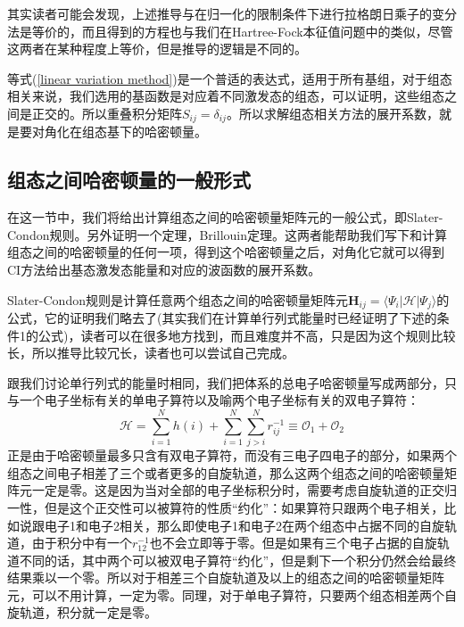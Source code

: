 \documentclass[12pt,a4paper,openany,twoside]{book}
\numberwithin{equation}{section}
\begin{document}
          其实读者可能会发现，上述推导与在归一化的限制条件下进行拉格朗日乘子的变分法是等价的，而且得到的方程也与我们在Hartree-Fock本征值问题中的类似，尽管这两者在某种程度上等价，但是推导的逻辑是不同的。

          等式(\ref{linear variation method})是一个普适的表达式，适用于所有基组，对于组态相关来说，我们选用的基函数是对应着不同激发态的组态，可以证明，这些组态之间是正交的。所以重叠积分矩阵$S_{ij} = \delta_{ij}$。所以求解组态相关方法的展开系数，就是要对角化在组态基下的哈密顿量。
        \subsection{组态之间哈密顿量的一般形式}
          在这一节中，我们将给出计算组态之间的哈密顿量矩阵元的一般公式，即Slater-Condon规则。另外证明一个定理，Brillouin定理。这两者能帮助我们写下和计算组态之间的哈密顿量的任何一项，得到这个哈密顿量之后，对角化它就可以得到CI方法给出基态激发态能量和对应的波函数的展开系数。

          Slater-Condon规则是计算任意两个组态之间的哈密顿量矩阵元$\mathbf{H}_{ij} = \langle \Psi_i | \mathscr{H} | \Psi_j \rangle $的公式，它的证明我们略去了(其实我们在计算单行列式能量时已经证明了下述的条件1的公式)，读者可以在很多地方找到，而且难度并不高，只是因为这个规则比较长，所以推导比较冗长，读者也可以尝试自己完成。

          跟我们讨论单行列式的能量时相同，我们把体系的总电子哈密顿量写成两部分，只与一个电子坐标有关的单电子算符以及喻两个电子坐标有关的双电子算符：
          \begin{equation}
            \mathscr{H} = \sum_{i=1}^N h(i) +\sum_{i=1}^N\sum_{j>i}^N r_{ij}^{-1} \equiv \mathcal{O}_1+\mathcal{O}_2
          \end{equation}
          正是由于哈密顿量最多只含有双电子算符，而没有三电子四电子的部分，如果两个组态之间电子相差了三个或者更多的自旋轨道，那么这两个组态之间的哈密顿量矩阵元一定是零。这是因为当对全部的电子坐标积分时，需要考虑自旋轨道的正交归一性，但是这个正交性可以被算符的性质“约化”：如果算符只跟两个电子相关，比如说跟电子1和电子2相关，那么即使电子1和电子2在两个组态中占据不同的自旋轨道，由于积分中有一个$r_{12}^{-1}$也不会立即等于零。但是如果有三个电子占据的自旋轨道不同的话，其中两个可以被双电子算符“约化”，但是剩下一个积分仍然会给最终结果乘以一个零。所以对于相差三个自旋轨道及以上的组态之间的哈密顿量矩阵元，可以不用计算，一定为零。同理，对于单电子算符，只要两个组态相差两个自旋轨道，积分就一定是零。
\end{document}
